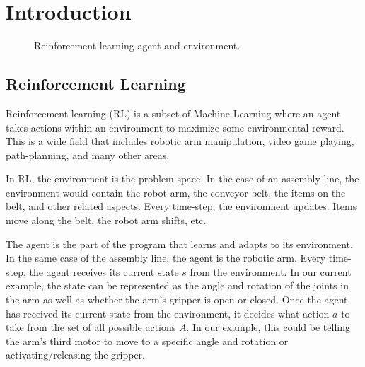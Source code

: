 \documentclass[12pt]{thesis}
\begin{document}



\body


\chapter{Introduction}
\begin{figure}
	\begin{center}
		\scalebox{0.5}{}
	\end{center}
	\caption{Reinforcement learning agent and environment.}
	\label{fig:RLagent}
\end{figure}
\section{Reinforcement Learning}
Reinforcement learning (RL) is a subset of Machine Learning where an agent takes actions within an environment to maximize some environmental reward. \cite{Sutton1998} This is a wide field that includes robotic arm manipulation, video game playing, path-planning, and many other areas.

In RL, the environment is the problem space. In the case of an assembly line, the environment would contain the robot arm, the conveyor belt, the items on the belt, and other related aspects. Every time-step, the environment updates. Items move along the belt, the robot arm shifts, etc.

The agent is the part of the program that learns and adapts to its environment. In the same case of the assembly line, the agent is the robotic arm. Every time-step, the agent receives its current state $s$ from the environment. In our current example, the state can be represented as the angle and rotation of the joints in the arm as well as whether the arm’s gripper is open or closed. Once the agent has received its current state from the environment, it decides what action $a$ to take from the set of all possible actions $A$. In our example, this could be telling the arm’s third motor to move to a specific angle and rotation or activating/releasing the gripper.
\end{document}
